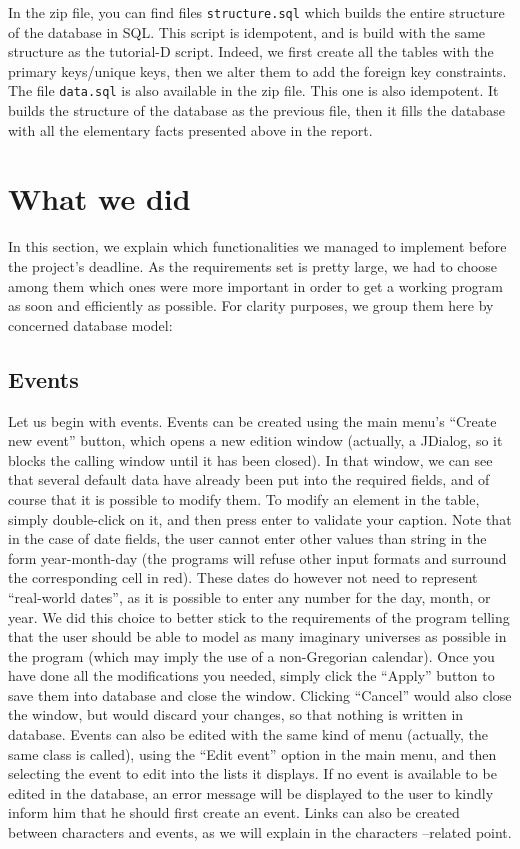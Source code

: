 \documentclass[a4paper ,12pt,french]{article}
\begin{document}
In the zip file, you can find files \texttt{structure.sql} which builds the entire structure of the database in SQL. This script is idempotent, and is build with the same structure as the tutorial-D script. Indeed, we first create all the tables with the primary keys/unique keys, then we alter them to add the foreign key constraints.\\


The file \texttt{data.sql} is also available in the zip file. This one is also idempotent. It builds the structure of the database as the previous file, then it fills the database with all the elementary facts presented above in the report.

\section{What we did}

In this section, we explain which functionalities we managed to implement before the project’s deadline. As the requirements set is pretty large, we had to choose among them which ones were more important in order to get a working program as soon and efficiently as possible. For clarity purposes, we group them here by concerned database model:

\subsection{Events}

Let us begin with events. 
Events can be created using the main menu’s “Create new event” button, which opens a new edition window (actually, a JDialog, so it blocks the calling window until it has been closed). In that window, we can see that several default data have already been put into the required fields, and of course that it is possible to modify them. To modify an element in the table, simply double-click on it, and then press enter to validate your caption. Note that in the case of date fields, the user cannot enter other values than string in the form year-month-day (the programs will refuse other input formats and surround the corresponding cell in red). These dates do however not need to represent “real-world dates”, as it is possible to enter any number for the day, month, or year. We did this choice to better stick to the requirements of the program telling that the user should be able to model as many imaginary universes as possible in the program (which may imply the use of a non-Gregorian calendar). Once you have done all the modifications you needed, simply click the “Apply” button to save them into database and close the window. Clicking “Cancel” would also close the window, but would discard your changes, so that nothing is written in database.
Events can also be edited with the same kind of menu (actually, the same class is called), using the “Edit event” option in the main menu, and then selecting the event to edit into the lists it displays. If no event is available to be edited in the database, an error message will be displayed to the user to kindly inform him that he should first create an event.
Links can also be created between characters and events, as we will explain in the characters –related point.
\end{document}
